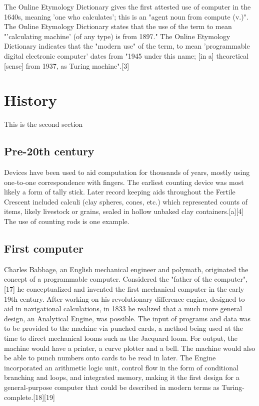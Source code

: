 \documentclass{article}
\begin{document}
The Online Etymology Dictionary gives the first attested use of computer in the 1640s, meaning 'one who calculates'; this is an "agent noun from compute (v.)". The Online Etymology Dictionary states that the use of the term to mean "'calculating machine' (of any type) is from 1897." The Online Etymology Dictionary indicates that the "modern use" of the term, to mean 'programmable digital electronic computer' dates from "1945 under this name; [in a] theoretical [sense] from 1937, as Turing machine".[3]

\section{History}
This is the second section

\subsection{Pre-20th century}

Devices have been used to aid computation for thousands of years, mostly using one-to-one correspondence with fingers. The earliest counting device was most likely a form of tally stick. Later record keeping aids throughout the Fertile Crescent included calculi (clay spheres, cones, etc.) which represented counts of items, likely livestock or grains, sealed in hollow unbaked clay containers.[a][4] The use of counting rods is one example.

\subsection{First computer}
Charles Babbage, an English mechanical engineer and polymath, originated the concept of a programmable computer. Considered the "father of the computer",[17] he conceptualized and invented the first mechanical computer in the early 19th century. After working on his revolutionary difference engine, designed to aid in navigational calculations, in 1833 he realized that a much more general design, an Analytical Engine, was possible. The input of programs and data was to be provided to the machine via punched cards, a method being used at the time to direct mechanical looms such as the Jacquard loom. For output, the machine would have a printer, a curve plotter and a bell. The machine would also be able to punch numbers onto cards to be read in later. The Engine incorporated an arithmetic logic unit, control flow in the form of conditional branching and loops, and integrated memory, making it the first design for a general-purpose computer that could be described in modern terms as Turing-complete.[18][19]
\end{document}
